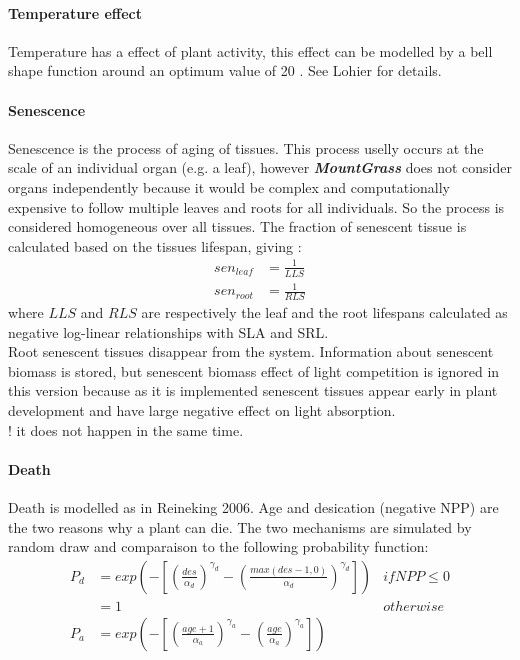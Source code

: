 \documentclass[a4paper,twoside, justified,marginals=raggedright]{tufte-handout}
\newcommand{\model}{\textit{\textbf{MountGrass }}}
\begin{document}
\paragraph{Temperature effect} Temperature has a effect of plant activity, this effect can be modelled by a bell shape function around an optimum value of 20 \celsius . See Lohier for details.


\paragraph{Senescence}

Senescence is the process of aging of tissues. This process uselly occurs at the scale of an individual organ (e.g. a leaf), however \model does not consider organs independently because it would be complex and computationally expensive to follow multiple leaves and roots for all individuals. So the process is considered homogeneous over all tissues. The fraction of senescent tissue is calculated based on the tissues lifespan, giving :
\begin{align}
sen_{leaf} &= \frac{1}{LLS}\\
sen_{root} &= \frac{1}{RLS}
\end{align}
where $LLS$ and $RLS$ are respectively the leaf and the root lifespans calculated as negative log-linear relationships with SLA and SRL.\\
\indent Root senescent tissues disappear from the system. Information about senescent biomass is stored, but senescent biomass effect of light competition is ignored in this version because as it is implemented senescent tissues appear early in plant development and have large negative effect on light absorption.\\
! it does not happen in the same time.

\paragraph{Death} Death is modelled as in Reineking 2006. Age and desication (negative NPP) are the two reasons why a plant can die. The two mechanisms are simulated by random draw and comparaison to the following probability function:
\begin{align}
P_{d} &=  exp \left( - \left[\left(\frac{des}{\alpha_{d}}\right)^{\gamma_{d}} - \left(\frac{max(des - 1, 0)}{\alpha_{d}}\right)^{\gamma_{d}}\right]\right) & if NPP \le 0\\
&= 1 & otherwise\\
P_{a} &= exp \left( - \left[\left(\frac{age + 1}{\alpha_{a}}\right)^{\gamma_{a}} - \left(\frac{age}{\alpha_{a}}\right)^{\gamma_{a}}\right]\right)\\
\end{align}
\end{document}
